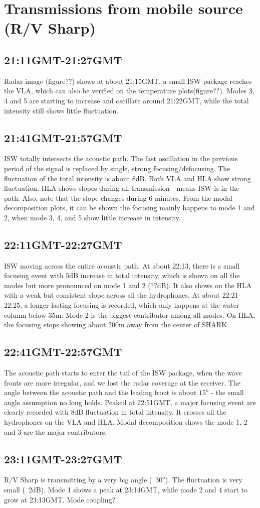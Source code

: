 
\section{Transmissions from mobile source (R/V Sharp)}


\subsection{21:11GMT-21:27GMT}
Radar image (figure??) shows at about 21:15GMT, a small ISW package
reaches the VLA, which can also be verified on the temperature
plots(figure??). Modes 3, 4 and 5 are starting to increase and
oscillate around 21:22GMT, while the total intensity still shows
little fluctuation.



\subsection{21:41GMT-21:57GMT}
ISW totally intersects the acoustic path. The fast oscillation in
the previous period of the signal is replaced by single, strong
focusing/defocusing. The fluctuation of the total intensity is about
8dB. Both VLA and HLA show strong fluctuation. HLA shows slopes
during all transmission - means ISW is in the path. Also, note that
the slope changes during 6 minutes. From the modal decomposition
plots, it can be shown the focusing mainly happens to mode 1 and 2,
when mode 3, 4, and 5 show little increase in intensity.

\subsection{22:11GMT-22:27GMT}
ISW moving across the entire acoustic path. At about 22:13, there is
a small focusing event with 5dB increase in total intensity, which
is shown on all the modes but more pronounced on mode 1 and 2
(??dB). It also shows on the HLA with a weak but consistent slope
across all the hydrophones. At about 22:21-22:25, a longer-lasting
focusing is recorded, which only happens at the water column below
35m. Mode 2 is the biggest contributor among all modes. On HLA, the
focusing stops showing about 200m away from the center of SHARK.

\subsection{22:41GMT-22:57GMT}
The acoustic path starts to enter the tail of the ISW package, when
the wave fronts are more irregular, and we lost the radar coverage
at the receiver. The angle between the acoustic path and the leading
front is about $15^o$ - the small angle assumption no long holds.
Peaked at 22:51GMT, a major focusing event are clearly recorded with
8dB fluctuation in total intensity. It crosses all the hydrophones
on the VLA and HLA. Modal decomposition shows the mode 1, 2 and 3
are the major contributors.

\subsection{23:11GMT-23:27GMT}
R/V Sharp is transmitting by a very big angle (~$30^o$). The
fluctuation is very small (~2dB). Mode 1 shows a peak at 23:14GMT,
while mode 2 and 4 start to grow at 23:13GMT. Mode coupling?

